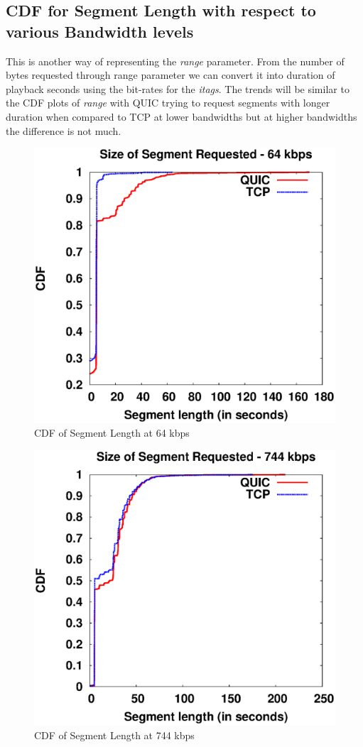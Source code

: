\subsection{CDF for Segment Length with respect to various Bandwidth levels}
This is another way of representing the \textit{range} parameter. From the number of bytes requested through range parameter we can convert it into duration of playback seconds using the bit-rates for the \textit{itags}. The trends will be similar to the CDF plots of \textit{range} with QUIC trying to request segments with longer duration when compared to TCP at lower bandwidths but at higher bandwidths the difference is not much.

\begin{figure}[!ht]
    \centering
    \includegraphics[width=0.9\linewidth]{img/CDF/plot_segment_65536}
    \caption{CDF of Segment Length at 64 kbps}
    \label{fig:seg6556}
\end{figure}
\begin{figure}[!ht]
    \centering
    \includegraphics[width=0.9\linewidth]{img/CDF/plot_segment_761856}
    \caption{CDF of Segment Length at 744 kbps}
    \label{fig:seg7621}
\end{figure}
